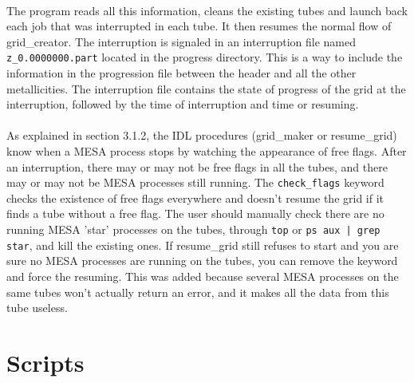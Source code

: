 \documentclass{report}
\begin{document}
\paragraph{} The program reads all this information, cleans the existing tubes and launch back each job that was interrupted in each tube. It then resumes the normal flow of grid\_creator. The interruption is signaled in an interruption file named \verb+z_0.0000000.part+ located in the progress directory. This is a way to include the information in the progression file between the header and all the other metallicities. The interruption file contains the state of progress of the grid at the interruption, followed by the time of interruption and time or resuming.

\paragraph{} As explained in section 3.1.2, the IDL procedures (grid\_maker or resume\_grid) know when a MESA process stops by watching the appearance of free flags. After an interruption, there may or may not be free flags in all the tubes, and there may or may not be MESA processes still running. The \verb+check_flags+ keyword checks the existence of free flags everywhere and doesn't resume the grid if it finds a tube without a free flag. The user should manually check there are no running MESA 'star' processes on the tubes, through \verb+top+ or \verb+ps aux | grep star+, and kill the existing ones. If resume\_grid still refuses to start and you are sure no MESA processes are running on the tubes, you can remove the keyword and force the resuming. This was added because several MESA processes on the same tubes won't actually return an error, and it makes all the data from this tube useless.

\section{Scripts}
\end{document}
